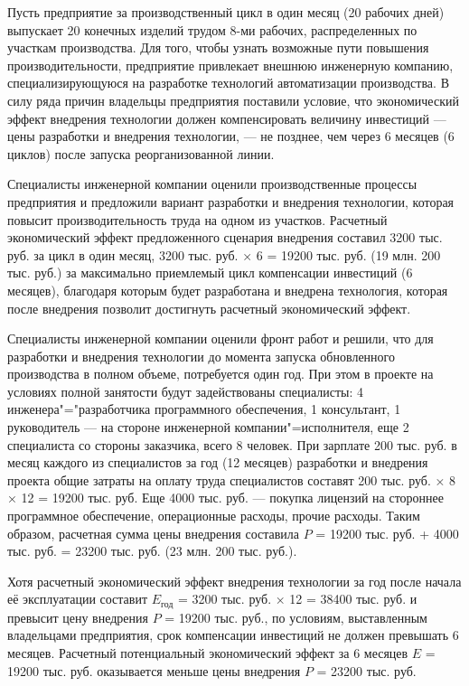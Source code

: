 \documentclass{article}
\begin{document}
Пусть предприятие за производственный цикл в один месяц (20 рабочих дней) выпускает 20 конечных изделий трудом 8-ми рабочих, распределенных по участкам производства. Для того, чтобы узнать возможные пути повышения производительности, предприятие привлекает внешнюю инженерную компанию, специализирующуюся на разработке технологий автоматизации производства. В силу ряда причин владельцы предприятия поставили условие, что экономический эффект внедрения технологии должен компенсировать величину инвестиций — цены разработки и внедрения технологии, — не позднее, чем через 6 месяцев (6 циклов) после запуска реорганизованной линии.

Специалисты инженерной компании оценили производственные процессы предприятия и предложили вариант разработки и внедрения технологии, которая повысит производительность труда на одном из участков. Расчетный экономический эффект предложенного сценария внедрения составил 3200 тыс. руб. за цикл в один месяц, 3200 тыс. руб. × 6 = 19200 тыс. руб. (19 млн. 200 тыс. руб.) за максимально приемлемый цикл компенсации инвестиций (6 месяцев), благодаря которым будет разработана и внедрена технология, которая после внедрения позволит достигнуть расчетный экономический эффект.

Специалисты инженерной компании оценили фронт работ и решили, что для разработки и внедрения технологии до момента запуска обновленного производства в полном объеме, потребуется один год. При этом в проекте на условиях полной занятости будут задействованы специалисты: 4 инженера"="разработчика программного обеспечения, 1 консультант, 1 руководитель — на стороне инженерной компании"=исполнителя, еще 2 специалиста со стороны заказчика, всего 8 человек. При зарплате 200 тыс. руб. в месяц каждого из специалистов за год (12 месяцев) разработки и внедрения проекта общие затраты на оплату труда специалистов составят 200 тыс. руб. × 8 × 12 = 19200 тыс. руб. Еще 4000 тыс. руб. — покупка лицензий на стороннее программное обеспечение, операционные расходы, прочие расходы. Таким образом, расчетная сумма цены внедрения составила $P$ = 19200 тыс. руб. + 4000 тыс. руб. = 23200 тыс. руб. (23 млн. 200 тыс. руб.).

Хотя расчетный экономический эффект внедрения технологии за год после начала её эксплуатации составит $E_{\mbox{год}}$ = 3200 тыс. руб. × 12 = 38400 тыс. руб. и превысит цену внедрения $P$ = 19200 тыс. руб., по условиям, выставленным владельцами предприятия, срок компенсации инвестиций не должен превышать 6 месяцев. Расчетный потенциальный экономический эффект за 6 месяцев $E$ = 19200 тыс. руб. оказывается меньше цены внедрения $P$ = 23200 тыс. руб.
\end{document}
